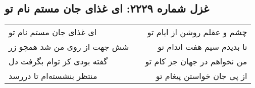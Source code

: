 \begin{center}
\section*{غزل شماره ۲۲۲۹: ای غذای جان مستم نام تو}
\label{sec:2229}
\begin{longtable}{l p{0.5cm} r}
ای غذای جان مستم نام تو
&&
چشم و عقلم روشن از ایام تو
\\
شش جهت از روی من شد همچو زر
&&
تا بدیدم سیم هفت اندام تو
\\
گفته بودی کز توام بگرفت دل
&&
من نخواهم در جهان جز کام تو
\\
منتظر بنشسته‌ام تا دررسد
&&
از پی جان خواستن پیغام تو
\\
\end{longtable}
\end{center}
